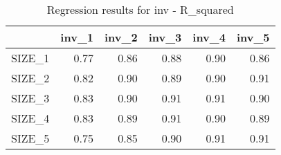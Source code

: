 \begin{table}[ht]
\centering
\caption{Regression results for inv - R_squared} 
\begin{tabular}{rrrrrr}
  \hline
 & inv\_1 & inv\_2 & inv\_3 & inv\_4 & inv\_5 \\ 
  \hline
SIZE\_1 & 0.77 & 0.86 & 0.88 & 0.90 & 0.86 \\ 
  SIZE\_2 & 0.82 & 0.90 & 0.89 & 0.90 & 0.91 \\ 
  SIZE\_3 & 0.83 & 0.90 & 0.91 & 0.91 & 0.90 \\ 
  SIZE\_4 & 0.83 & 0.89 & 0.91 & 0.90 & 0.89 \\ 
  SIZE\_5 & 0.75 & 0.85 & 0.90 & 0.91 & 0.91 \\ 
   \hline
\end{tabular}
\end{table}


